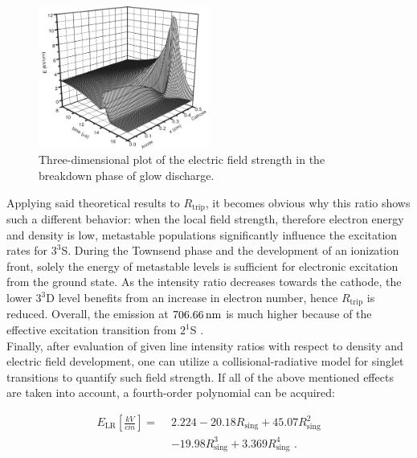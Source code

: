 \documentclass[a4paper,10pt,twoside]{article}
\newcommand{\ix}[1]{_\text{#1}}
\begin{document}
			\begin{figure}[t!]
				\centering
				\includegraphics[width=0.5\textwidth]{figures/lineratio/golubovskiip47fig9}
				\caption{Three-dimensional plot of the electric field strength in the breakdown phase of glow discharge. \cite{0022-3727-36-1-306}}
				\label{img:golubovskii}
			\end{figure}
		
		Applying said theoretical results to $R\ix{trip}$, it becomes obvious why this ratio shows such a different behavior: when the local field strength, therefore electron energy and density is low, metastable populations significantly influence the excitation rates for $3^3$S. During the Townsend phase and the development of an ionization front, solely the energy of metastable levels is sufficient for electronic excitation from the ground state. As the intensity ratio decreases towards the cathode, the lower $3^3$D level benefits from an increase in electron number, hence $R\ix{trip}$ is reduced. Overall, the emission at $\unit[706.66]{nm}$ is much higher because of the effective excitation transition from $2^1$S \cite{linratio1_14}.\\
		Finally, after evaluation of given line intensity ratios with respect to density and electric field development, one can utilize a collisional-radiative model for singlet transitions \cite{linratio1_14} to quantify such field strength. If all of the above mentioned effects are taken into account, a fourth-order polynomial can be acquired:
		
			\begin{align}
				E\ix{LR}\left[\frac{kV}{cm}\right] =\,\, &2.224-20.18R\ix{sing}+45.07R\ix{sing}^2 \nonumber \\ 
				&-19.98R\ix{sing}^3+3.369R\ix{sing}^4\,\,. \label{eq:elfield}
			\end{align}
				
\end{document}
